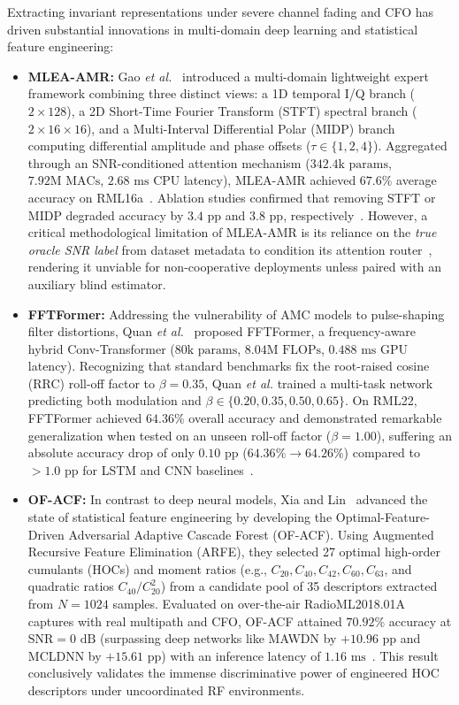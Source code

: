 Extracting invariant representations under severe channel fading and CFO has driven substantial innovations in multi-domain deep learning and statistical feature engineering:
\begin{itemize}
    \item \textbf{MLEA-AMR:} Gao \emph{et al.}~\cite{gao2026mlea} introduced a multi-domain lightweight expert framework combining three distinct views: a 1D temporal I/Q branch ($2 \times 128$), a 2D Short-Time Fourier Transform (STFT) spectral branch ($2 \times 16 \times 16$), and a Multi-Interval Differential Polar (MIDP) branch computing differential amplitude and phase offsets ($\tau \in \{1, 2, 4\}$). Aggregated through an SNR-conditioned attention mechanism ($342.4\text{k params}$, $7.92\text{M MACs}$, $2.68\text{ ms}$ CPU latency), MLEA-AMR achieved $67.6\%$ average accuracy on RML16a~\cite[Table~III]{gao2026mlea}. Ablation studies confirmed that removing STFT or MIDP degraded accuracy by $3.4\text{ pp}$ and $3.8\text{ pp}$, respectively~\cite[Table~IV]{gao2026mlea}. However, a critical methodological limitation of MLEA-AMR is its reliance on the \emph{true oracle SNR label} from dataset metadata to condition its attention router~\cite[Sec.~V]{gao2026mlea}, rendering it unviable for non-cooperative deployments unless paired with an auxiliary blind estimator.
    \item \textbf{FFTFormer:} Addressing the vulnerability of AMC models to pulse-shaping filter distortions, Quan \emph{et al.}~\cite{quan2026fftformer} proposed FFTFormer, a frequency-aware hybrid Conv-Transformer ($80\text{k params}$, $8.04\text{M FLOPs}$, $0.488\text{ ms}$ GPU latency). Recognizing that standard benchmarks fix the root-raised cosine (RRC) roll-off factor to $\beta = 0.35$, Quan \emph{et al.} trained a multi-task network predicting both modulation and $\beta \in \{0.20, 0.35, 0.50, 0.65\}$. On RML22, FFTFormer achieved $64.36\%$ overall accuracy and demonstrated remarkable generalization when tested on an unseen roll-off factor ($\beta = 1.00$), suffering an absolute accuracy drop of only $0.10\text{ pp}$ ($64.36\% \to 64.26\%$) compared to $>1.0\text{ pp}$ for LSTM and CNN baselines~\cite[Table~6]{quan2026fftformer}.
    \item \textbf{OF-ACF:} In contrast to deep neural models, Xia and Lin~\cite{xia2026optimal} advanced the state of statistical feature engineering by developing the Optimal-Feature-Driven Adversarial Adaptive Cascade Forest (OF-ACF). Using Augmented Recursive Feature Elimination (ARFE), they selected 27 optimal high-order cumulants (HOCs) and moment ratios (e.g., $C_{20}, C_{40}, C_{42}, C_{60}, C_{63}$, and quadratic ratios $C_{40}/C_{20}^2$) from a candidate pool of 35 descriptors extracted from $N=1024$ samples. Evaluated on over-the-air RadioML2018.01A captures with real multipath and CFO, OF-ACF attained $70.92\%$ accuracy at $\text{SNR} = 0\text{ dB}$ (surpassing deep networks like MAWDN by $+10.96\text{ pp}$ and MCLDNN by $+15.61\text{ pp}$) with an inference latency of $1.16\text{ ms}$~\cite[Table~IV]{xia2026optimal}. This result conclusively validates the immense discriminative power of engineered HOC descriptors under uncoordinated RF environments.
\end{itemize}

